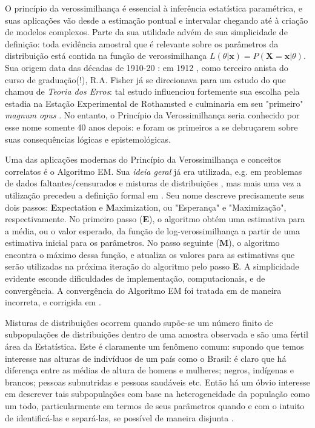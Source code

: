 \documentclass[
	article,			%
	11pt,				%
	oneside,			%
	a4paper,			%
	english,			%
	brazil,				%
	sumario=tradicional
	]{abntex2}
\begin{document}
O princípio da verossimilhança é essencial à inferência estatística paramétrica, e suas aplicações vão desde a estimação pontual e intervalar chegando até à criação de modelos complexos. Parte da sua utilidade advém de sua simplicidade de definição: toda evidência amostral que é relevante sobre os parâmetros da distribuição está contida na função de verossimilhança $L(\theta|\mathbf{x}) = P(\mathbf{X} = \mathbf{x} | \theta)$. Sua origem data das décadas de 1910-20 \cite{aldrich1997ra}: em 1912 \cite{fisher1912absolute}, como terceiro anista do curso de graduação(!), R.A. Fisher já se direcionava para um estudo do que chamou de \textit{Teoria dos Erros}: tal estudo influenciou fortemente sua  escolha pela estadia na Estação Experimental de Rothamsted e culminaria em seu "primeiro" \textit{magnum opus} \cite{fisher1925statistical}. No entanto, o Princípio da Verossimilhança seria conhecido por esse nome somente 40 anos depois: \cite{birnbaum1962foundations} e \cite{hacking1965logic} foram os primeiros a se debruçarem sobre suas consequências lógicas e epistemológicas.

Uma das aplicações modernas do Princípio da Verossimilhança e conceitos correlatos é o Algoritmo EM. Sua \textit{ideia geral} já era utilizada, e.g. em problemas de dados faltantes/censurados \cite{sundberg1974maximum} e misturas de distribuições \cite{martin1974notion}, mas mais uma vez a utilização precedeu a definição formal em \cite{dempster1977maximum}. Seu nome descreve precisamente seus dois passos: \textbf{E}xpectation e  \textbf{M}aximization, ou "Esperança" e "Maximização", respectivamente. No primeiro passo (\textbf{E}), o algoritmo obtém uma estimativa para a média, ou o valor esperado, da função de log-verossimilhança a partir de uma estimativa inicial para os parâmetros. No passo seguinte (\textbf{M}), o algoritmo encontra o máximo dessa função, e atualiza os valores para as estimativas que serão utilizadas na próxima iteração do algoritmo pelo passo \textbf{E}. A simplicidade evidente esconde dificuldades de implementação, computacionais, e de convergência. A convergência do Algoritmo EM foi tratada em \cite{dempster1977maximum} de maneira incorreta, e corrigida em \cite{wu1983convergence}.

Misturas de distribuições ocorrem quando supõe-se um número finito de subpopulações de distribuições dentro de uma amostra observada e são uma fértil área da Estatística. Este é claramente um fenômeno comum: supondo que temos interesse nas alturas de indivíduos de um país como o Brasil: é claro que há diferença entre as médias de altura de homens e mulheres; negros, indígenas e brancos; pessoas subnutridas e pessoas saudáveis etc. Então há um óbvio interesse em descrever tais subpopulações com base na heterogeneidade da população como um todo, particularmente em termos de seus parâmetros quando e com o intuito de identificá-las e separá-las, se possível de maneira disjunta \cite{arcidiacono2003finite}.
\end{document}
